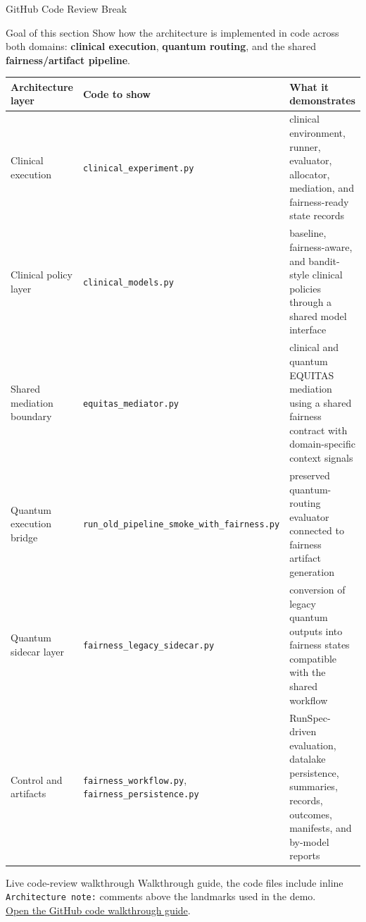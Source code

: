 \documentclass[aspectratio=169,10pt]{beamer}
\begin{document}
\begin{frame}{GitHub Code Review Break}
\begin{block}{Goal of this section}
Show how the architecture is implemented in code across both domains: 
\textbf{clinical execution}, \textbf{quantum routing}, and the shared 
\textbf{fairness/artifact pipeline}.
\end{block}

\scriptsize
\begin{tabular}{p{}p{}p{}}
\toprule
\textbf{Architecture layer} & \textbf{Code to show} & \textbf{What it demonstrates} \\
\midrule

Clinical execution &
\texttt{clinical\_experiment.py} &
clinical environment, runner, evaluator, allocator, mediation, and fairness-ready state records \\

Clinical policy layer &
\texttt{clinical\_models.py} &
baseline, fairness-aware, and bandit-style clinical policies through a shared model interface \\

Shared mediation boundary &
\texttt{equitas\_mediator.py} &
clinical and quantum EQUITAS mediation using a shared fairness contract with domain-specific context signals \\

Quantum execution bridge &
{\tiny\texttt{run\_old\_pipeline\_smoke\_with\_fairness.py}} &
preserved quantum-routing evaluator connected to fairness artifact generation \\

Quantum sidecar layer &
\texttt{fairness\_legacy\_sidecar.py} &
conversion of legacy quantum outputs into fairness states compatible with the shared workflow \\

Control and artifacts &
\texttt{fairness\_workflow.py}, \texttt{fairness\_persistence.py} &
RunSpec-driven evaluation, datalake persistence, summaries, records, outcomes, manifests, and by-model reports \\

\bottomrule
\end{tabular}

\begin{block}{Live code-review walkthrough}
Walkthrough guide, the code files include inline 
\texttt{Architecture note:} comments above the landmarks used in the demo.\\
\href{https://github.com/pzg8794/DSCI601-workspace/blob/main/docs/presentation/CODE_PRESENTATION_GUIDE.md}
{Open the GitHub code walkthrough guide}.
\end{block}
\end{frame}
\end{document}
